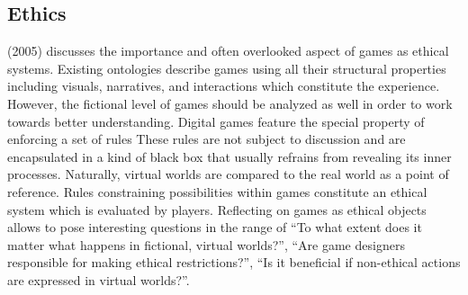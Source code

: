 \subsection{Ethics}
\citeauthor{Sicart2005} (2005) discusses the importance and often overlooked aspect of games as ethical systems.
Existing ontologies describe games using all their structural properties including visuals, narratives, and interactions which constitute the experience.
However, the fictional level of games should be analyzed as well in order to work towards better understanding.
Digital games feature the special property of enforcing a set of rules
These rules are not subject to discussion and are encapsulated in a kind of black box that usually refrains from revealing its inner processes.
Naturally, virtual worlds are compared to the real world as a point of reference.
Rules constraining possibilities within games constitute an ethical system which is evaluated by players.
Reflecting on games as ethical objects allows to pose interesting questions in the range of ``To what extent does it matter what happens in fictional, virtual worlds?'', ``Are game designers responsible for making ethical restrictions?'', ``Is it beneficial if non-ethical actions are expressed in virtual worlds?''.